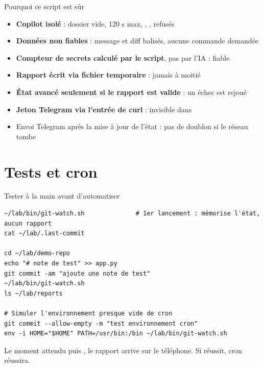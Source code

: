\documentclass[aspectratio=169,10pt,t]{beamer}
\begin{document}
\begin{frame}[fragile]{Pourquoi ce script est s\^ur}
\begin{itemize}
\item \textbf{Copilot isol\'e} : dossier vide, 120 s max, , ,  refus\'es
\item \textbf{Donn\'ees non fiables} : message et diff balis\'es, aucune commande demand\'ee
\item \textbf{Compteur de secrets calcul\'e par le script}, pas par l'IA : fiable
\item \textbf{Rapport \'ecrit via fichier temporaire} : jamais \`a moiti\'e
\item \textbf{\'Etat avanc\'e seulement si le rapport est valide} : un \'echec est rejou\'e
\item \textbf{Jeton Telegram via l'entr\'ee de curl} : invisible dans 
\item Envoi Telegram apr\`es la mise \`a jour de l'\'etat : pas de doublon si le r\'eseau tombe
\end{itemize}
\end{frame}

\section{Tests et cron}
\begin{frame}[fragile]{Tester \`a la main avant d'automatiser}
\begin{lstlisting}[style=term]
~/lab/bin/git-watch.sh              # 1er lancement : mémorise l'état, aucun rapport
cat ~/lab/.last-commit

cd ~/lab/demo-repo
echo "# note de test" >> app.py
git commit -am "ajoute une note de test"
~/lab/bin/git-watch.sh
ls ~/lab/reports

# Simuler l'environnement presque vide de cron
git commit --allow-empty -m "test environnement cron"
env -i HOME="$HOME" PATH=/usr/bin:/bin ~/lab/bin/git-watch.sh
\end{lstlisting}
\begin{exampleblock}{Le moment attendu}
 puis , le rapport arrive sur le t\'el\'ephone. Si  r\'eussit, cron r\'eussira.
\end{exampleblock}
\end{frame}
\end{document}
